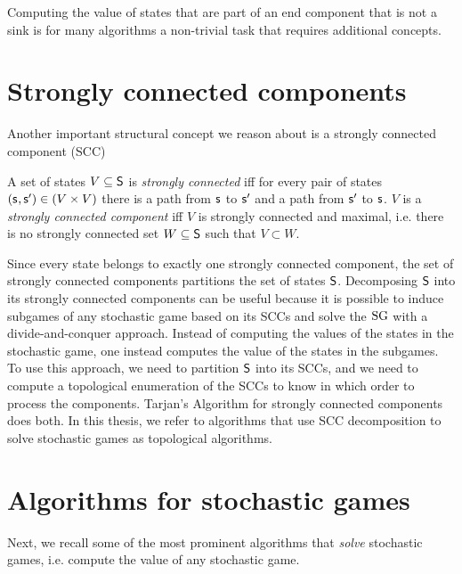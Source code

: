 Computing the value of states that are part of an end component that is not a sink is for many algorithms a non-trivial task that requires
additional concepts.

\section{Strongly connected components} \label{sec:SCC}
Another important structural concept we reason about is a strongly connected component (SCC)
\begin{definition}\label{def:SCC}
A set of states $V \subseteq \mathsf{S}$ is \emph{strongly connected} iff for every pair of states $(\state, \state') \in (V \times V)$ there is a path from $\state$ to $\state'$ and a path from $\state'$ to $\state$.
$V$ is a \emph{strongly connected component} iff $V$ is strongly connected and maximal, i.e. there is no strongly connected set $W \subseteq \mathsf{S}$ such that $V \subset W$.
\end{definition}

Since every state belongs to exactly one strongly connected component, the set of strongly connected components partitions the set of states $\mathsf{S}$.
Decomposing $\mathsf{S}$ into its strongly connected components can be useful because it is possible to induce subgames of any stochastic game based on its
SCCs and solve the $\textrm{SG}$ with a divide-and-conquer approach. 
Instead of computing the values of the states in the stochastic game, one instead computes the value of the states in the subgames.
To use this approach, we need to partition $\mathsf{S}$ into its SCCs, and we need to compute a topological enumeration of the SCCs to know in which order to process the components.
Tarjan's Algorithm for strongly connected components \cite{TarjansAlgorithm} does both. 
In this thesis, we refer to algorithms that use SCC decomposition to solve stochastic games as topological algorithms.

\section{Algorithms for stochastic games} \label{sec:SGAlgos}
Next, we recall some of the most prominent algorithms that \emph{solve} stochastic games, i.e. compute the value of any stochastic game.

